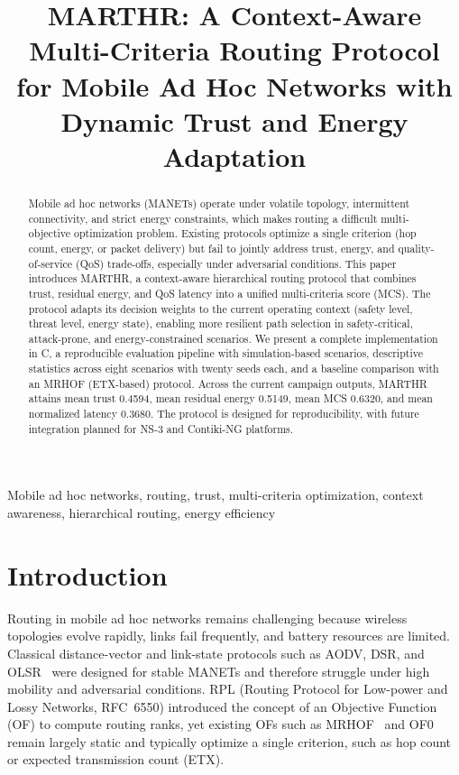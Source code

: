 \documentclass[conference]{IEEEtran}
\title{MARTHR: A Context-Aware Multi-Criteria Routing Protocol for Mobile Ad Hoc Networks with Dynamic Trust and Energy Adaptation}
\author{\IEEEauthorblockN{Madani Belacel}
\IEEEauthorblockA{Abdelhamid Ibn Badis University of Mostaganem\\
Mostaganem, Algeria\\
madani.belacel@univ-mosta.dz}}
\begin{document}
\maketitle

\begin{abstract}
Mobile ad hoc networks (MANETs) operate under volatile topology, intermittent connectivity, and strict energy constraints, which makes routing a difficult multi-objective optimization problem. Existing protocols optimize a single criterion (hop count, energy, or packet delivery) but fail to jointly address trust, energy, and quality-of-service (QoS) trade-offs, especially under adversarial conditions. This paper introduces MARTHR, a context-aware hierarchical routing protocol that combines trust, residual energy, and QoS latency into a unified multi-criteria score (MCS). The protocol adapts its decision weights to the current operating context (safety level, threat level, energy state), enabling more resilient path selection in safety-critical, attack-prone, and energy-constrained scenarios. We present a complete implementation in C, a reproducible evaluation pipeline with simulation-based scenarios, descriptive statistics across eight scenarios with twenty seeds each, and a baseline comparison with an MRHOF (ETX-based) protocol. Across the current campaign outputs, MARTHR attains mean trust 0.4594, mean residual energy 0.5149, mean MCS 0.6320, and mean normalized latency 0.3680. The protocol is designed for reproducibility, with future integration planned for NS-3 and Contiki-NG platforms.
\end{abstract}

\begin{IEEEkeywords}
Mobile ad hoc networks, routing, trust, multi-criteria optimization, context awareness, hierarchical routing, energy efficiency
\end{IEEEkeywords}

\section{Introduction}

Routing in mobile ad hoc networks remains challenging because wireless topologies evolve rapidly, links fail frequently, and battery resources are limited. Classical distance-vector and link-state protocols such as AODV, DSR, and OLSR~\cite{clausen2003optimized} were designed for stable MANETs and therefore struggle under high mobility and adversarial conditions. RPL (Routing Protocol for Low-power and Lossy Networks, RFC~6550) introduced the concept of an Objective Function (OF) to compute routing ranks, yet existing OFs such as MRHOF~\cite{gnaneswaran2012mrhof} and OF0 remain largely static and typically optimize a single criterion, such as hop count or expected transmission count (ETX).
\end{document}
